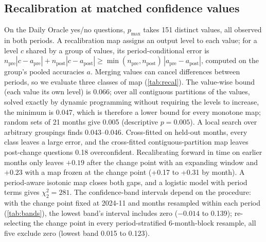\documentclass[10pt,twocolumn]{article}
\newcommand{\pmax}{p_{\max}}
\begin{document}
\subsection{Recalibration at matched confidence values}
\label{app:everyf}
On the Daily Oracle yes/no questions, $\pmax$ takes 151 distinct values, all
observed in both periods. A recalibration map assigns an output level to each
value; for a level $c$ shared by a group of values, its period-conditional
error is $n_{\text{pre}}|c-a_{\text{pre}}| + n_{\text{post}}|c-a_{\text{post}}|
\ge \min(n_{\text{pre}},n_{\text{post}})\,|a_{\text{pre}}-a_{\text{post}}|$,
computed on the group's pooled accuracies $a$. Merging values can cancel
differences between periods, so we evaluate three classes of map
(\cref{tab:recal}). The value-wise bound (each value its own level) is 0.066;
over all contiguous partitions of the values, solved exactly by dynamic
programming without requiring the levels to increase, the minimum is 0.047,
which is therefore a lower bound for every monotone map; random sets of 21
months give 0.005 (descriptive $p=0.005$). A local search over arbitrary
groupings finds 0.043--0.046. Cross-fitted on held-out months, every class
leaves a large error, and the cross-fitted contiguous-partition map leaves
post-change questions 0.18 overconfident. Recalibrating forward in time on earlier months
only leaves $+0.19$ after the change point with an expanding window and
$+0.23$ with a map frozen at the change point (+0.17 to +0.31 by month). A
period-aware isotonic map closes both gaps, and a logistic model with period
terms gives $\chi^2_2=281$. The confidence-band intervals depend on the
procedure: with the change point fixed at 2024-11 and months resampled within
each period (\cref{tab:bands}), the lowest band's interval includes zero
($-0.014$ to 0.139); re-selecting the change point in every period-stratified
6-month-block resample, all five exclude zero (lowest band 0.015 to 0.123).
\end{document}
